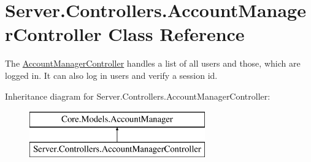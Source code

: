 \hypertarget{classServer_1_1Controllers_1_1AccountManagerController}{}\section{Server.\+Controllers.\+Account\+Manager\+Controller Class Reference}
\label{classServer_1_1Controllers_1_1AccountManagerController}


The \hyperlink{classServer_1_1Controllers_1_1AccountManagerController}{Account\+Manager\+Controller} handles a list of all users and those, which are logged in. It can also log in users and verify a session id.  


Inheritance diagram for Server.\+Controllers.\+Account\+Manager\+Controller\+:\begin{figure}[H]
\begin{center}
\leavevmode
\includegraphics[height=2.000000cm]{classServer_1_1Controllers_1_1AccountManagerController}
\end{center}
\end{figure}
